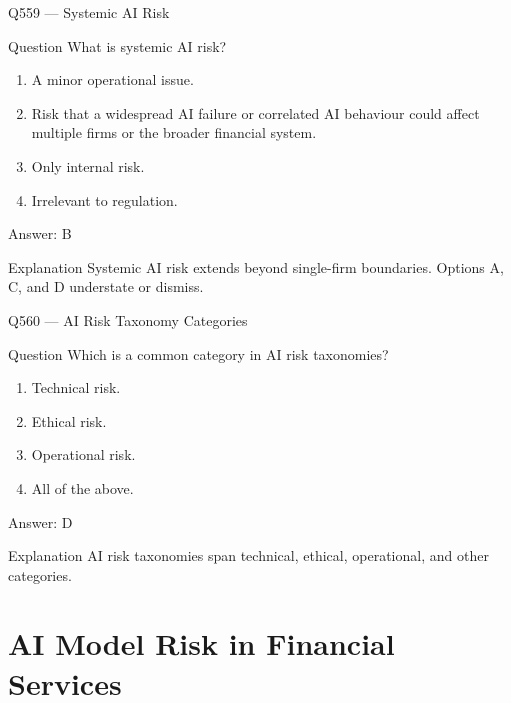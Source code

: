 \documentclass[aspectratio=169,8pt]{beamer}
\begin{document}
	\begin{frame}{Q559 --- Systemic AI Risk}
		\begin{block}{Question}
			What is systemic AI risk?
			\begin{enumerate}
				\item A minor operational issue.
				\item Risk that a widespread AI failure or correlated AI behaviour could affect multiple firms or the broader financial system.
				\item Only internal risk.
				\item Irrelevant to regulation.
			\end{enumerate}
		\end{block}
		\begin{exampleblock}{Answer: B}\end{exampleblock}
		\begin{block}{Explanation}
			Systemic AI risk extends beyond single-firm boundaries. Options A, C, and D understate or dismiss.
		\end{block}
	\end{frame}
	
	\begin{frame}{Q560 --- AI Risk Taxonomy Categories}
		\begin{block}{Question}
			Which is a common category in AI risk taxonomies?
			\begin{enumerate}
				\item Technical risk.
				\item Ethical risk.
				\item Operational risk.
				\item All of the above.
			\end{enumerate}
		\end{block}
		\begin{exampleblock}{Answer: D}\end{exampleblock}
		\begin{block}{Explanation}
			AI risk taxonomies span technical, ethical, operational, and other categories.
		\end{block}
	\end{frame}
	
	\section{AI Model Risk in Financial Services}
	
\end{document}
